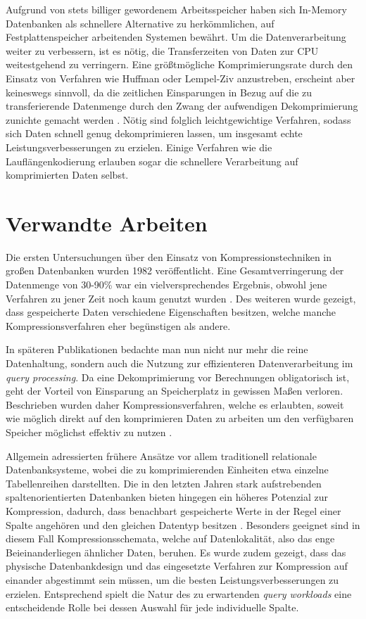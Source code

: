 Aufgrund von stets billiger gewordenem Arbeitsspeicher haben sich In-Memory Datenbanken als schnellere Alternative zu herkömmlichen, auf Festplattenspeicher arbeitenden Systemen bewährt. Um die Datenverarbeitung weiter zu verbessern, ist es nötig, die Transferzeiten von Daten zur CPU weitestgehend zu verringern. Eine größtmögliche Komprimierungsrate durch den Einsatz von Verfahren wie Huffman oder Lempel-Ziv anzustreben, erscheint aber keineswegs sinnvoll, da die zeitlichen Einsparungen in Bezug auf die zu transferierende Datenmenge durch den Zwang der aufwendigen Dekomprimierung zunichte gemacht werden \cite{Abadi2006}. Nötig sind folglich leichtgewichtige Verfahren, sodass sich Daten schnell genug dekomprimieren lassen, um insgesamt echte Leistungsverbesserungen zu erzielen. Einige Verfahren wie die Lauflängenkodierung erlauben sogar die schnellere Verarbeitung auf komprimierten Daten selbst.

\section{Verwandte Arbeiten}

Die ersten Untersuchungen über den Einsatz von Kompressionstechniken in großen Datenbanken wurden 1982 veröffentlicht. Eine Gesamtverringerung der Datenmenge von 30-90\% war ein vielversprechendes Ergebnis, obwohl jene Verfahren zu jener Zeit noch kaum genutzt wurden \cite{Severance1982}. Des weiteren wurde gezeigt, dass gespeicherte Daten verschiedene Eigenschaften besitzen, welche manche Kompressionsverfahren eher begünstigen als andere.

In späteren Publikationen bedachte man nun nicht nur mehr die reine Datenhaltung, sondern auch die Nutzung zur effizienteren Datenverarbeitung im \textit{query processing}. Da eine Dekomprimierung vor Berechnungen obligatorisch ist, geht der Vorteil von Einsparung an Speicherplatz in gewissen Maßen verloren. Beschrieben wurden daher Kompressionsverfahren, welche es erlaubten, soweit wie möglich direkt auf den komprimieren Daten zu arbeiten um den verfügbaren Speicher möglichst effektiv zu nutzen \cite{Graefe1991}.

Allgemein adressierten frühere Ansätze vor allem traditionell relationale Datenbanksysteme, wobei die zu komprimierenden Einheiten etwa einzelne Tabellenreihen darstellten. Die in den letzten Jahren stark aufstrebenden spaltenorientierten Datenbanken bieten hingegen ein höheres Potenzial zur Kompression, dadurch, dass benachbart gespeicherte Werte in der Regel einer Spalte angehören und den gleichen Datentyp besitzen \cite{Abadi2006}. Besonders geeignet sind in diesem Fall Kompressionsschemata, welche auf Datenlokalität, also das enge Beieinanderliegen ähnlicher Daten, beruhen. Es wurde zudem gezeigt, dass das physische Datenbankdesign und das eingesetzte Verfahren zur Kompression auf einander abgestimmt sein müssen, um die besten Leistungsverbesserungen zu erzielen. Entsprechend spielt die Natur des zu erwartenden \textit{query workloads} eine entscheidende Rolle bei dessen Auswahl für jede individuelle Spalte.

